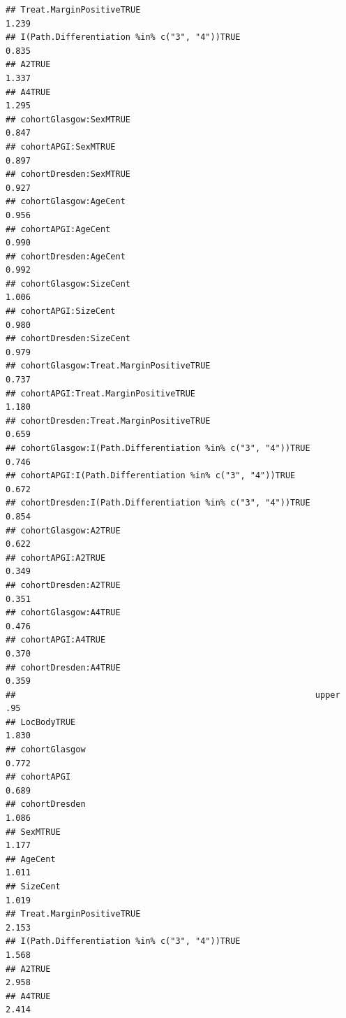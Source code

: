 \documentclass{article}\usepackage[]{graphicx}\usepackage[]{color}
\makeatletter
\newenvironment{kframe}{%
 \def\at@end@of@kframe{}%
 \ifinner\ifhmode%
  \def\at@end@of@kframe{\end{minipage}}%
  \begin{minipage}{\columnwidth}%
 \fi\fi%
 \def\FrameCommand##1{\hskip\@totalleftmargin \hskip-\fboxsep
 \colorbox{shadecolor}{##1}\hskip-\fboxsep
     \hskip-\linewidth \hskip-\@totalleftmargin \hskip\columnwidth}%
 \MakeFramed {\advance\hsize-\width
   \@totalleftmargin\z@ \linewidth\hsize
   \@setminipage}}%
 {\par\unskip\endMakeFramed%
 \at@end@of@kframe}
\newenvironment{knitrout}{}{} %
\makeatother
\begin{document}
\begin{knitrout}
\begin{kframe}
\begin{verbatim}
## Treat.MarginPositiveTRUE                                       1.239
## I(Path.Differentiation %in% c("3", "4"))TRUE                   0.835
## A2TRUE                                                         1.337
## A4TRUE                                                         1.295
## cohortGlasgow:SexMTRUE                                         0.847
## cohortAPGI:SexMTRUE                                            0.897
## cohortDresden:SexMTRUE                                         0.927
## cohortGlasgow:AgeCent                                          0.956
## cohortAPGI:AgeCent                                             0.990
## cohortDresden:AgeCent                                          0.992
## cohortGlasgow:SizeCent                                         1.006
## cohortAPGI:SizeCent                                            0.980
## cohortDresden:SizeCent                                         0.979
## cohortGlasgow:Treat.MarginPositiveTRUE                         0.737
## cohortAPGI:Treat.MarginPositiveTRUE                            1.180
## cohortDresden:Treat.MarginPositiveTRUE                         0.659
## cohortGlasgow:I(Path.Differentiation %in% c("3", "4"))TRUE     0.746
## cohortAPGI:I(Path.Differentiation %in% c("3", "4"))TRUE        0.672
## cohortDresden:I(Path.Differentiation %in% c("3", "4"))TRUE     0.854
## cohortGlasgow:A2TRUE                                           0.622
## cohortAPGI:A2TRUE                                              0.349
## cohortDresden:A2TRUE                                           0.351
## cohortGlasgow:A4TRUE                                           0.476
## cohortAPGI:A4TRUE                                              0.370
## cohortDresden:A4TRUE                                           0.359
##                                                            upper .95
## LocBodyTRUE                                                    1.830
## cohortGlasgow                                                  0.772
## cohortAPGI                                                     0.689
## cohortDresden                                                  1.086
## SexMTRUE                                                       1.177
## AgeCent                                                        1.011
## SizeCent                                                       1.019
## Treat.MarginPositiveTRUE                                       2.153
## I(Path.Differentiation %in% c("3", "4"))TRUE                   1.568
## A2TRUE                                                         2.958
## A4TRUE                                                         2.414

\end{verbatim}
\end{kframe}
\end{knitrout}
\end{document}
